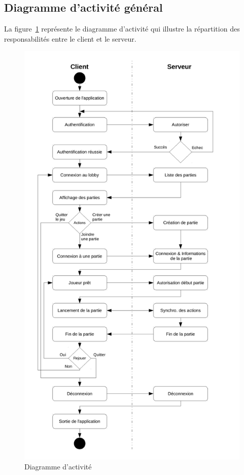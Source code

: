 \documentclass[a4paper,12pt]{article}
\begin{document}
	\subsection{Diagramme d'activité général}
	La figure~\ref{fig:diagramme_activite} représente le diagramme d'activité qui illustre la répartition des responsabilités entre le client et le serveur.
	\begin{figure}[!ht]
		\centering
		\includegraphics[scale=0.6]{Diagramme_Activite.pdf}
		\caption{Diagramme d'activité}
		\label{fig:diagramme_activite}
	\end{figure}
	
\end{document}
